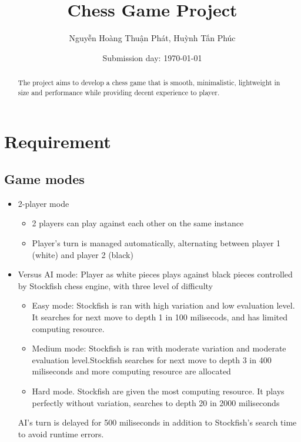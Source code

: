 \documentclass[a4paper, 10pt, titlepage]{report}
\title{Chess Game Project}
\author{Nguyễn Hoàng Thuận Phát, Huỳnh Tấn Phúc}
\date{Submission day: \selectlanguage{english}\today}
\begin{document}
\maketitle
{}
\renewcommand{\abstractname}{Overview}
\begin{abstract}
  The project aims to develop a chess game that is smooth, minimalistic, lightweight in size and performance while providing decent experience to player.
\end{abstract}

\tableofcontents
\chapter{Requirement}

\section{Game modes}
\begin{itemize}
  \item 2-player mode
        \begin{itemize}
          \item 2 players can play against each other on the same instance
          \item Player's turn is managed automatically, alternating between player 1 (white) and player 2 (black)
        \end{itemize}
  \item Versus AI mode: Player as white pieces plays against black pieces controlled by Stockfish chess engine, with three level of difficulty
        \begin{itemize}
          \item Easy mode: Stockfish is ran with high variation and low evaluation level. It searches for next move to depth 1 in 100 milisecods, and has limited computing resource.
          \item Medium mode: Stockfish is ran with moderate variation and moderate evaluation level.Stockfish searches for next move to depth 3 in 400 miliseconds and more computing resource are allocated
          \item Hard mode. Stockfish are given the most computing resource. It plays perfectly without variation, searches to depth 20 in 2000 miliseconds
        \end{itemize}
        AI's turn is delayed for 500 miliseconds in addition to Stockfish's search time to avoid runtime errors.
\end{itemize}
\end{document}
